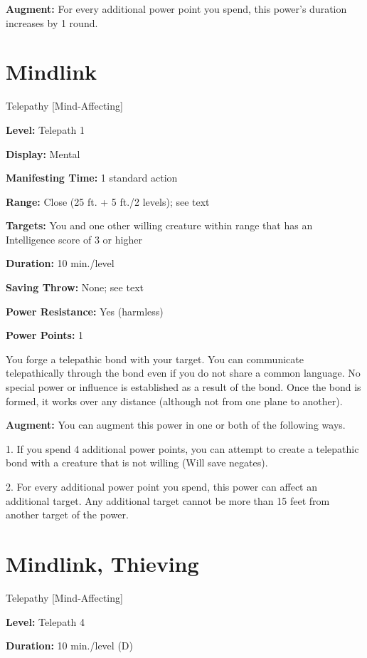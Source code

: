\documentclass{article}
\begin{document}
\textbf{Augment:} For every additional power point you spend, this power's duration 
increases by 1 round.

\vspace{12pt}
\section*{Mindlink}

Telepathy [Mind-Affecting]

\textbf{Level:} Telepath 1

\textbf{Display:} Mental

\textbf{Manifesting Time:} 1 standard action

\textbf{Range:} Close (25 ft. + 5 ft./2 levels); see text

\textbf{Targets:} You and one other willing creature within range that has an Intelligence 
score of 3 or higher

\textbf{Duration:} 10 min./level

\textbf{Saving Throw:} None; see text

\textbf{Power Resistance:} Yes (harmless)

\textbf{Power Points:} 1

You forge a telepathic bond with your target. You can communicate telepathically 
through the bond even if you do not share a common language. No special power or 
influence is established as a result of the bond. Once the bond is formed, it works 
over any distance (although not from one plane to another).

\textbf{Augment:} You can augment this power in one or both of the following ways.

1. If you spend 4 additional power points, you can attempt to create a telepathic 
bond with a creature that is not willing (Will save negates).

2. For every additional power point you spend, this power can affect an additional 
target. Any additional target cannot be more than 15 feet from another target of 
the power.

\vspace{12pt}
\section*{Mindlink, Thieving}

Telepathy [Mind-Affecting]

\textbf{Level:} Telepath 4

\textbf{Duration:} 10 min./level (D)
\end{document}
